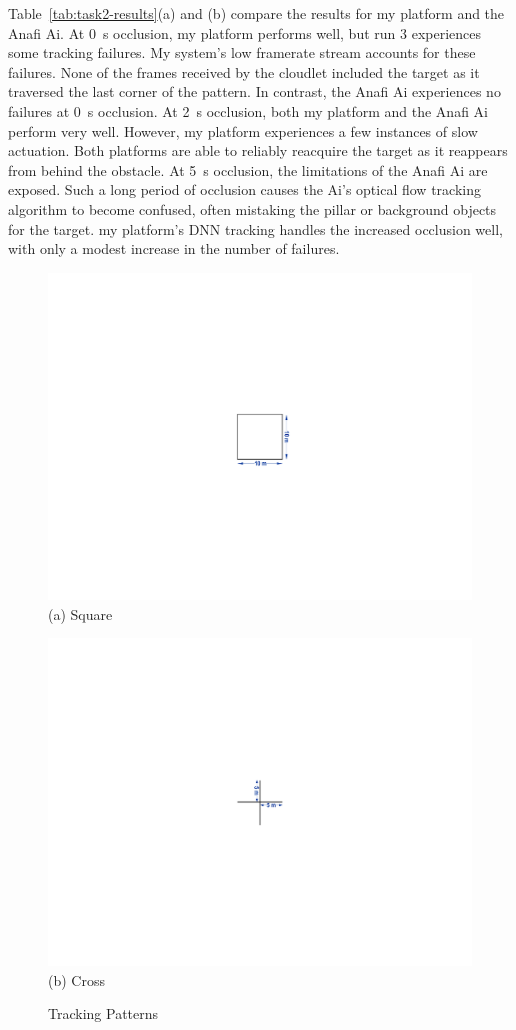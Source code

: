 Table~\ref{tab:task2-results}(a) and (b) compare the results for my
platform and the Anafi Ai.  At 0~s occlusion, my platform performs
well, but run 3 experiences some tracking failures.  My system's low
framerate stream accounts for these failures.  None of the frames
received by the cloudlet included the target as it traversed the last
corner of the pattern.  In contrast, the Anafi Ai experiences no
failures at 0~s occlusion.  At 2~s occlusion, both my platform and
the Anafi Ai perform very well.  However, my platform experiences a
few instances of slow actuation.  Both platforms are able to reliably
reacquire the target as it reappears from behind the obstacle.  At 5~s
occlusion, the limitations of the Anafi Ai are exposed. Such a long
period of occlusion causes the Ai's optical flow tracking algorithm to
become confused, often mistaking the pillar or background objects for
the target. my platform's DNN tracking handles the increased
occlusion well, with only a modest increase in the number of failures.

\begin{figure}
\begin{minipage}[b]{0.5\linewidth}
\centering
\includegraphics[width=0.6\linewidth]{chapter4/FIGS/fig-pattern-square.pdf}\\
{(a) Square}\\
\end{minipage}
\begin{minipage}[b]{0.5\linewidth}
\centering
\includegraphics[width=0.6\linewidth]{chapter4/FIGS/fig-pattern-cross.pdf}\\
{(b) Cross}\\
\end{minipage}
\caption{Tracking Patterns}
\label{fig:patterns}
\end{figure}

